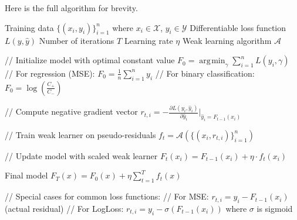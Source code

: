 \documentclass{article}
\DeclareMathOperator*{\argmin}{\arg\!\min}
\begin{document}
        \begin{algo}
          Here is the full algorithm for brevity. 
          \begin{algorithm}[H]
            \label{alg:gradboost}
            \begin{algorithmic}[1]
              \Require Training data $\{(x_i, y_i)\}_{i=1}^n$ where $x_i \in \mathcal{X}$, $y_i \in \mathcal{Y}$
              \Require Differentiable loss function $L(y, \hat{y})$
              \Require Number of iterations $T$
              \Require Learning rate $\eta$
              \Require Weak learning algorithm $\mathcal{A}$

              \State // Initialize model with optimal constant value
              \State $F_0 = \argmin_\gamma \sum_{i=1}^n L(y_i, \gamma)$
              \State // For regression (MSE): $F_0 = \frac{1}{n}\sum_{i=1}^n y_i$
              \State // For binary classification: $F_0 = \log(\frac{C_+}{C_-})$

                  \State // Compute negative gradient vector
                      \State $r_{t,i} = -\frac{\partial L(y_i, \hat{y}_i)}{\partial \hat{y}_i}\big|_{\hat{y}_i = F_{t-1}(x_i)}$
                  \EndFor
                  
                  \State // Train weak learner on pseudo-residuals
                  \State $f_t = \mathcal{A}(\{(x_i, r_{t,i})\}_{i=1}^n)$
                  
                  \State // Update model with scaled weak learner
                      \State $F_t(x_i) = F_{t-1}(x_i) + \eta \cdot f_t(x_i)$
                  \EndFor
              \EndFor

              \State \Return Final model $F_T(x) = F_0(x) + \eta \sum_{t=1}^T f_t(x)$

              \State // Special cases for common loss functions:
              \State // For MSE: $r_{t,i} = y_i - F_{t-1}(x_i)$ (actual residual)
              \State // For LogLoss: $r_{t,i} = y_i - \sigma(F_{t-1}(x_i))$ where $\sigma$ is sigmoid
            \end{algorithmic}
          \end{algorithm}
        \end{algo}
\end{document}
